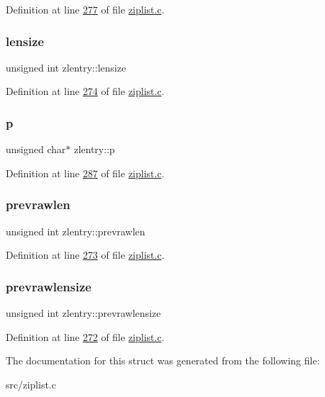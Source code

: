 Definition at line \hyperlink{ziplist_8c_source_l00277}{277} of file \hyperlink{ziplist_8c_source}{ziplist.\+c}.

\mbox{\label{structzlentry_a3c93675d93d87e94c7a860b739156c06}} 
\subsubsection{\texorpdfstring{lensize}{lensize}}
{\footnotesize\ttfamily unsigned int zlentry\+::lensize}



Definition at line \hyperlink{ziplist_8c_source_l00274}{274} of file \hyperlink{ziplist_8c_source}{ziplist.\+c}.

\mbox{\label{structzlentry_a157a43a064e79250f610936cebfc244a}} 
\subsubsection{\texorpdfstring{p}{p}}
{\footnotesize\ttfamily unsigned char$\ast$ zlentry\+::p}



Definition at line \hyperlink{ziplist_8c_source_l00287}{287} of file \hyperlink{ziplist_8c_source}{ziplist.\+c}.

\mbox{\label{structzlentry_a9442ecbe1369042aabf42e5eca19d471}} 
\subsubsection{\texorpdfstring{prevrawlen}{prevrawlen}}
{\footnotesize\ttfamily unsigned int zlentry\+::prevrawlen}



Definition at line \hyperlink{ziplist_8c_source_l00273}{273} of file \hyperlink{ziplist_8c_source}{ziplist.\+c}.

\mbox{\label{structzlentry_a768061947ee172be656985b45b482dcc}} 
\subsubsection{\texorpdfstring{prevrawlensize}{prevrawlensize}}
{\footnotesize\ttfamily unsigned int zlentry\+::prevrawlensize}



Definition at line \hyperlink{ziplist_8c_source_l00272}{272} of file \hyperlink{ziplist_8c_source}{ziplist.\+c}.



The documentation for this struct was generated from the following file\+:\begin{DoxyCompactItemize}
\item 
src/ziplist.\+c\end{DoxyCompactItemize}
